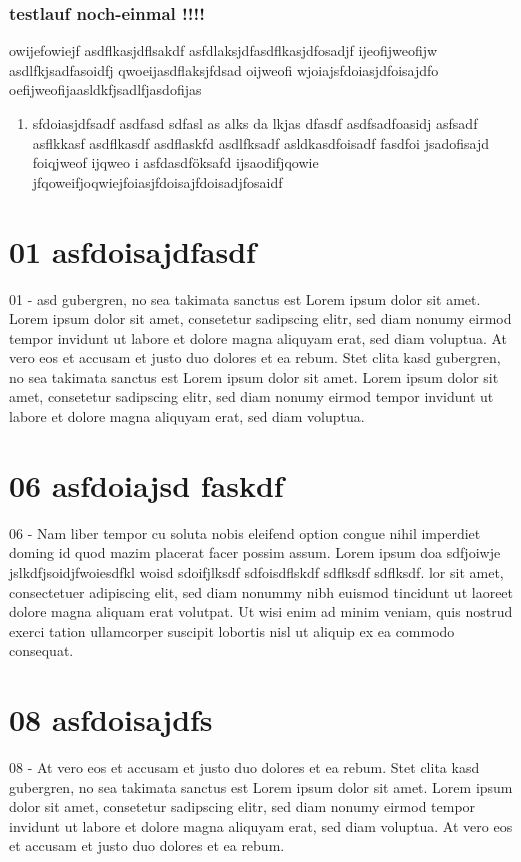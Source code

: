 \documentclass[11pt]{article}
\begin{document}
\subsubsection{testlauf noch-einmal !!!!}
\label{sec:org421c22a}
owijefowiejf
asdflkasjdflsakdf
asfdlaksjdfasdflkasjdfosadjf
ijeofijweofijw
asdlfkjsadfasoidfj qwoeijasdflaksjfdsad oijweofi wjoiajsfdoiasjdfoisajdfo oefijweofijaasldkfjsadlfjasdofijas
\begin{enumerate}
\item sfdoiasjdfsadf
\label{sec:org70c5cb3}
asdfasd sdfasl as alks da lkjas dfasdf
asdfsadfoasidj asfsadf asflkkasf asdflkasdf
asdflaskfd asdlfksadf asldkasdfoisadf
fasdfoi jsadofisajd foiqjweof ijqweo i
asfdasdföksafd ijsaodifjqowie   
jfqoweifjoqwiejfoiasjfdoisajfdoisadjfosaidf
\end{enumerate}
\section{01 asfdoisajdfasdf}
\label{sec:orgca3633a}
01 - asd gubergren, no sea takimata sanctus est Lorem ipsum dolor sit amet. Lorem ipsum dolor sit amet, consetetur sadipscing elitr, sed diam nonumy eirmod tempor invidunt ut labore et dolore magna aliquyam erat, sed diam voluptua. At vero eos et accusam et justo duo dolores et ea rebum. Stet clita kasd gubergren, no sea takimata sanctus est Lorem ipsum dolor sit amet. Lorem ipsum dolor sit amet, consetetur sadipscing elitr, sed diam nonumy eirmod tempor invidunt ut labore et dolore magna aliquyam erat, sed  diam voluptua.
\section{06 asfdoiajsd faskdf}
\label{sec:org72185ec}
06 - Nam liber tempor cu  soluta nobis eleifend option congue nihil
imperdiet doming id quod mazim placerat facer possim assum. Lorem
ipsum doa sdfjoiwje jslkdfjsoidjfwoiesdfkl woisd sdoifjlksdf
sdfoisdflskdf sdflksdf sdflksdf. lor sit amet, consectetuer adipiscing
elit, sed diam nonummy nibh euismod tincidunt ut laoreet dolore magna
aliquam erat volutpat. Ut wisi enim ad minim veniam, quis nostrud
exerci tation ullamcorper suscipit lobortis nisl ut aliquip ex ea
commodo consequat.
\section{08 asfdoisajdfs}
\label{sec:orgbe74f69}
08 - At vero eos et accusam et justo duo dolores et ea rebum. Stet clita
kasd gubergren, no sea takimata sanctus est Lorem ipsum dolor sit
amet. Lorem ipsum dolor sit amet, consetetur sadipscing elitr, sed
diam nonumy eirmod tempor invidunt ut labore et dolore magna aliquyam
erat, sed diam voluptua. At vero eos et accusam et justo duo dolores
et ea rebum.
\end{document}
